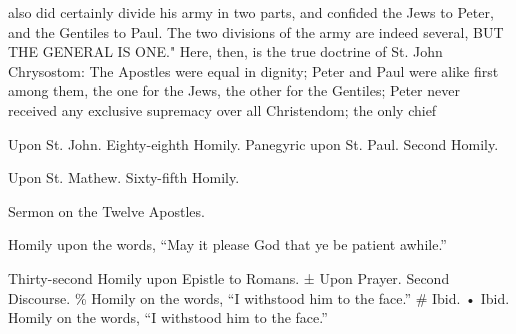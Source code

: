 also did certainly divide his army in two parts, and confided the Jews to Peter, and the Gentiles to Paul. The two divisions of the army are indeed several, BUT THE GENERAL IS ONE." Here, then, is the true doctrine of St. John Chrysostom: The Apostles were equal in dignity; Peter and Paul were alike first among them, the one for the Jews, the other for the Gentiles; Peter never received any exclusive supremacy over all Christendom; the only chief

Upon St. John. Eighty-eighth Homily. Panegyric upon St. Paul. Second Homily.

Upon St. Mathew. Sixty-fifth Homily.

Sermon on the Twelve Apostles.

Homily upon the words, “May it please God that ye be patient awhile.”

Thirty-second Homily upon Epistle to Romans. ± Upon Prayer. Second Discourse. \% Homily on the words, “I withstood him to the face.” \# Ibid. • Ibid. Homily on the words, “I withstood him to the face.”

